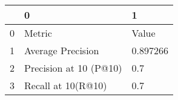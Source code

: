 \begin{tabular}{lll}
\toprule
{} &                       0 &         1 \\
\midrule
0 &                  Metric &     Value \\
1 &       Average Precision &  0.897266 \\
2 &  Precision at 10 (P@10) &       0.7 \\
3 &      Recall at 10(R@10) &       0.7 \\
\bottomrule
\end{tabular}
